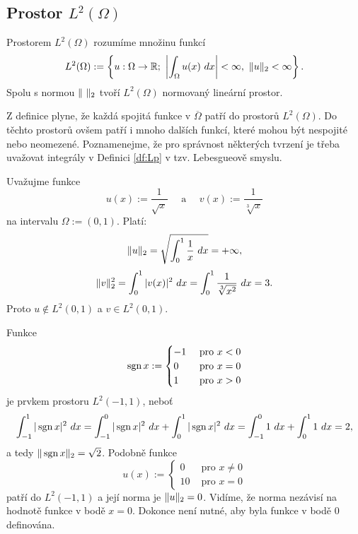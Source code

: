 



\subsection{Prostor $L^2(\Omega)$}

\begin{df}
\label{df:Lp}
Prostorem $L^2(\Omega)$ rozumíme množinu funkcí
\[ L^2(\Omega):=\left\{u:\Omega\rightarrow\mathbb R;~\left|\int_\Omega u(x)~dx\right|<\infty,~\|u\|_2<\infty \right\}. \]
Spolu s normou $\|\ \|_2$ tvoří $L^2(\Omega)$ normovaný lineární prostor.
\end{df}

Z definice plyne, že každá spojitá funkce v $\overline\Omega$ patří do prostorů $L^2(\Omega)$.
Do těchto prostorů ovšem patří i mnoho dalších funkcí, které mohou být nespojité nebo neomezené.
Poznamenejme, že pro správnost některých tvrzení je třeba uvažovat integrály v Definici \ref{df:Lp} v tzv. Lebesgueově smyslu.

\begin{ex}
Uvažujme funkce
\[ u(x) := \frac1{\sqrt{x}} \quad\mbox{ a }\quad v(x) := \frac1{\sqrt[3]{x}} \]
na intervalu $\Omega:=(0,1)$.
Platí:
\[ \|u\|_2 = \sqrt{\int_0^1 \frac1x~dx} = +\infty, \]
\[ \|v\|_2^2 = \int_0^1 |v(x)|^2~dx = \int_0^1 \frac1{\sqrt[3]{x^2}}~dx = 3. \]
Proto $u\notin L^2(0,1)$ a $v\in L^2(0,1)$.
\end{ex}

\begin{ex}
Funkce
\[ \operatorname{sgn} x:=\begin{cases}-1 & \mbox{ pro }x<0\\0 & \mbox{ pro }x=0\\1 & \mbox{ pro }x>0\end{cases} \]
je prvkem prostoru $L^2(-1,1)$, neboť
\[ \int_{-1}^1 |\operatorname{sgn} x|^2~dx = \int_{-1}^0 |\operatorname{sgn} x|^2 ~dx + \int_0^1 |\operatorname{sgn} x|^2~dx = \int_{-1}^0 1~dx + \int_0^1 1~dx = 2, \]
a tedy $\|\operatorname{sgn} x\|_2 = \sqrt{2}$.
Podobně funkce
\[ u(x) := \begin{cases}0 & \mbox{ pro }x\neq 0\\10 & \mbox{ pro }x=0\end{cases} \]
patří do $L^2(-1,1)$ a její norma je $\|u\|_2=0$.
Vidíme, že norma nezávisí na hodnotě funkce v bodě $x=0$. Dokonce není nutné, aby byla funkce v bodě 0 definována.
\end{ex}

